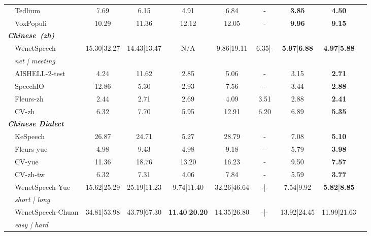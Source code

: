 \begin{table}[ht]
{\begin{tabular}{@{}clccccc|ccc@{}}
    & Tedlium                & 7.69  & 6.15 & 4.91    & 6.84  & - & \textbf{3.85}   & \textbf{4.50} \\
    & VoxPopuli             & 10.29 & 11.36 & 12.12   & 12.05 & - & \textbf{9.96}   & \textbf{9.15}  \\

\midrule
\multicolumn{9}{l}{\textit{\textbf{Chinese~(zh)}}} \\ \midrule
    & WenetSpeech  & \multirow{2}{*}{15.30|32.27} & \multirow{2}{*}{14.43|13.47} & \multirow{2}{*}{N/A}  & \multirow{2}{*}{9.86|19.11} & \multirow{2}{*}{6.35|-} & \multirow{2}{*}{\textbf{5.97}|\textbf{6.88}} & \multirow{2}{*}{\textbf{4.97}|\textbf{5.88}} \\
    & \textit{net | meeting} &    &       &      &         &        & & \\
    & AISHELL-2-test           & 4.24  & 11.62 & 2.85  & 5.06 & - & 3.15 & \textbf{2.71} \\
    & SpeechIO     & 12.86 & 5.30 & 2.93   & 7.56 & - & 3.44 & \textbf{2.88} \\
    & Fleurs-zh           & 2.44  & 2.71 & 2.69 & 4.09 & 3.51 & 2.88 & \textbf{2.41} \\
    & CV-zh     & 6.32  & 7.70 & 5.95    & 12.91 & 6.20 & 6.89 & \textbf{5.35} \\

\midrule
\multicolumn{9}{l}{\textit{\textbf{Chinese Dialect}}} \\ \midrule
    & KeSpeech     & 26.87 & 24.71 & 5.27  & 28.79 & - & 7.08 & \textbf{5.10} \\
    & Fleurs-yue   & 4.98  & 9.43 & 4.98 & 9.18 & - & 5.79 & \textbf{3.98} \\
    & CV-yue       & 11.36 & 18.76 & 13.20  & 16.23 & - & 9.50 & \textbf{7.57} \\
    & CV-zh-tw     & 6.32  & 7.31 & 4.06   & 7.84 & - & 5.59 & \textbf{3.77} \\
    & WenetSpeech-Yue        & \multirow{2}{*}{15.62|25.29}  &   \multirow{2}{*}{25.19|11.23}  & \multirow{2}{*}{9.74|11.40} & \multirow{2}{*}{32.26|46.64} & \multirow{2}{*}{-|-} & \multirow{2}{*}{7.54|9.92} & \multirow{2}{*}{\textbf{5.82}|\textbf{8.85}} \\
    & \textit{short | long}   &  &   &  &      & & & \\
    & WenetSpeech-Chuan      & \multirow{2}{*}{34.81|53.98}   & \multirow{2}{*}{43.79|67.30} & \multirow{2}{*}{\textbf{11.40}|\textbf{20.20}}   &  \multirow{2}{*}{14.35|26.80} & \multirow{2}{*}{-|-} & \multirow{2}{*}{13.92|24.45} & \multirow{2}{*}{11.99|21.63} \\
    & \textit{easy | hard }  &  &   &       &      &  & & \\
\bottomrule
\end{tabular}%
}
\end{table}

